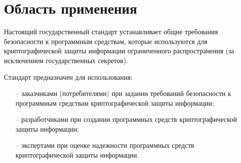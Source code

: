 \chapter{Область применения}\label{Scope}

Настоящий государственный стандарт устанавливает 
общие требования безопасности к программным средствам,
которые используются для криптографической защиты информации
ограниченного распространения (за исключением государственных секретов). 

Стандарт предназначен для использования:
\begin{itemize}
\item[--]
заказчиками (потребителями) при задании требований безопасности к
программным средствам криптографической защиты информации;

\item[--]
разработчиками при создании 
программных средств криптографической защиты информации;

\item[--]
экспертами при оценке надежности
программных средств криптографической защиты информации.
\end{itemize}

